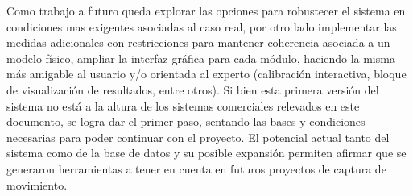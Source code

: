 

Como trabajo a futuro queda explorar las opciones para robustecer el sistema en condiciones mas exigentes asociadas al caso real, por otro lado implementar las medidas adicionales con restricciones para mantener coherencia asociada a un modelo físico, ampliar la interfaz gráfica para cada módulo, haciendo la misma más amigable al usuario y/o orientada al experto (calibración interactiva, bloque de visualización de resultados, entre otros).
Si bien esta primera versión del sistema no está a la altura de los sistemas comerciales relevados en este documento, se logra dar el primer paso, sentando las bases y condiciones necesarias para poder continuar con el proyecto.
El potencial actual tanto del sistema como de la base de datos y su posible expansión permiten afirmar que se generaron herramientas a tener en cuenta en futuros proyectos de captura de movimiento.


